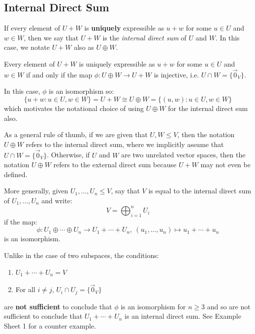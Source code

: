 \documentclass[../main.tex]{subfiles}
\begin{document}
\subsection{Internal Direct Sum}
\begin{definition}
  If every element of $U + W$ is \textbf{uniquely} expressible as $u + w$ for some $u \in U$ and $w \in W$, then we say that $U + W$ is the \textit{internal direct sum} of $U$ and $W$.
  In this case, we notate $U + W$ also as $U \oplus W$.
\end{definition}
\begin{remark}[Note]
  Every element of $U + W$ is uniquely expressible as $u + w$ for some $u \in U$ and $w \in W$ if and only if the map $\phi: U \oplus W \to U + W$ is injective, i.e. $U \cap W = \{\vec{0}_{V}\}$.

  In this case, $\phi$ is an isomorphism so:
  \[
    \{u + w: u \in U, w \in W\} = U + W \cong U \oplus W = \{(u, w): u \in U, w \in W\}
  \]
  which motivates the notational choice of using $U \oplus W$ for the internal direct sum also.

  As a general rule of thumb, if we are given that $U, W \leq V$, then the notation $U \oplus W$ refers to the internal direct sum, where we implicitly assume that $U \cap W = \{\vec{0}_V\}$.
  Otherwise, if $U$ and $W$ are two unrelated vector spaces, then the notation $U \oplus W$ refers to the external direct sum because $U + W$ may not even be defined.
\end{remark}
More generally, given $U_1, \ldots, U_n \leq V$, say that $V$ is equal to the internal direct sum of $U_1, \ldots, U_n$ and write:
\[
  V = \bigoplus_{i = 1}^{n} U_i
\]
if the map:
\[
  \phi: U_1 \oplus \cdots \oplus U_n \to U_1 + \cdots + U_n,\ (u_1, \ldots, u_n) \mapsto u_1 + \cdots + u_n
\]
is an isomorphism.
\begin{remark}[Warning]
  Unlike in the case of two subspaces, the conditions:
  \begin{enumerate}
    \item $U_1 + \cdots + U_n = V$
    \item For all $i \neq j$, $U_i \cap U_j = \{\vec{0}_{V}\}$
  \end{enumerate}
  are \textbf{not sufficient} to conclude that $\phi$ is an isomorphism for $n \geq 3$ and so are not sufficient to conclude that $U_1 + \cdots + U_n$ is an internal direct sum.
  See Example Sheet 1 for a counter example.
\end{remark}
\end{document}
